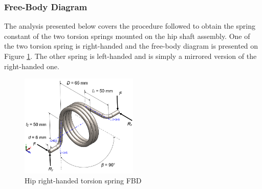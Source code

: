 \subsubsection{Free-Body Diagram}
The analysis presented below covers the procedure followed to obtain the spring constant of the two torsion springs mounted on the hip shaft assembly. One of the two torsion spring is right-handed and the free-body diagram is presented on Figure \ref{fig:HipSpring}. The other spring is left-handed and is simply a mirrored version of the right-handed one.
\begin{figure}
    \centering
    \includegraphics[width=0.5\textwidth]{4_Analysis/img/Spring/Hip_Spring_Ann.PNG}
    \caption{Hip right-handed torsion spring FBD}
    \label{fig:HipSpring}
\end{figure}
